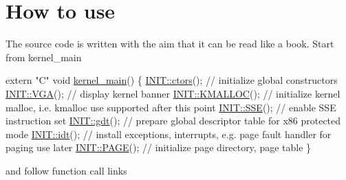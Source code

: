 \hypertarget{index_intro_sec}{}\section{How to use}\label{index_intro_sec}
The source code is written with the aim that it can be read like a book. Start from kernel\+\_\+main 
\begin{DoxyCodeInclude}
\textcolor{keyword}{extern} \textcolor{stringliteral}{"C"} \textcolor{keywordtype}{void} \hyperlink{kernel_8cpp_ada8402e0c504af8cafef5cc76c076003}{kernel\_main}()
\{
    \hyperlink{namespace_i_n_i_t_a6608557e41ad37cdb4a408e2f05c9783}{INIT::ctors}();   \textcolor{comment}{// initialize global constructors}
    \hyperlink{namespace_i_n_i_t_abae5789d80f8edd37455f3b167779654}{INIT::VGA}();     \textcolor{comment}{// display kernel banner}
    \hyperlink{namespace_i_n_i_t_ac811302ce0948a6a097b445b811f9c14}{INIT::KMALLOC}(); \textcolor{comment}{// initialize kernel malloc, i.e. kmalloc use supported after this point}
    \hyperlink{namespace_i_n_i_t_a8928ddbb4ca671dfe1c740da380fa0c4}{INIT::SSE}();     \textcolor{comment}{// enable SSE instruction set}
    \hyperlink{namespace_i_n_i_t_a3462d7bc51bce77cc240d05b62b1b777}{INIT::gdt}();     \textcolor{comment}{// prepare global descriptor table for x86 protected mode}
    \hyperlink{namespace_i_n_i_t_aec8e9f01cb09653075b6e610096b3ca9}{INIT::idt}();     \textcolor{comment}{// install exceptions, interrupts, e.g. page fault handler for paging use
       later}
    \hyperlink{namespace_i_n_i_t_aea383d3de30095cf9d176fa60b66d01d}{INIT::PAGE}();    \textcolor{comment}{// initialize page directory, page table}
\}
\end{DoxyCodeInclude}
and follow function call links 